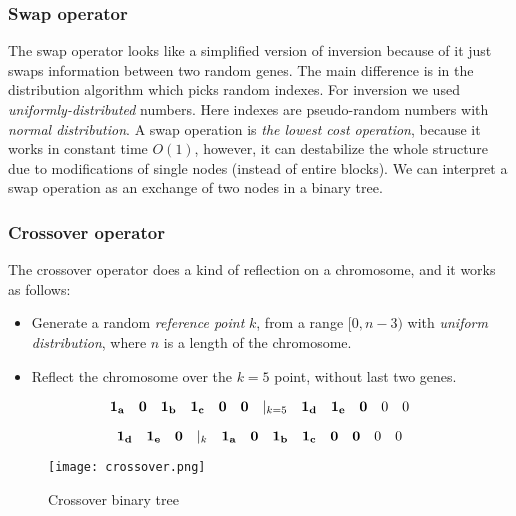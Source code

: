\documentclass[12pt]{article}
\begin{document}
\subsubsection{Swap operator}

The swap operator looks like a simplified version of inversion because of it just swaps information between two random genes. The main difference is in the distribution algorithm which picks random indexes. For inversion we used \textit{uniformly-distributed} numbers. Here indexes are pseudo-random numbers with \textit{normal distribution}.
A swap operation is \textit{the lowest cost operation}, because it works in constant time $O(1)$, however, it can destabilize the whole structure due to modifications of single nodes (instead of entire blocks). We can interpret a swap operation as an exchange of two nodes in a binary tree.



\subsubsection{Crossover operator}

The crossover operator does a kind of reflection on a chromosome, and it works as follows:
\begin{itemize}
\item Generate a random \textit{reference point} $k$, from a range $[0, n-3)$ with \textit{uniform distribution}, where $n$ is a length of the chromosome.
\item Reflect the chromosome over the $k=5$ point, without last two genes.
\end{itemize}

\[
    {\bf1_a\quad 0\quad 1_b\quad 1_c\quad 0\quad 0}\quad|_{k=5}\quad {\bf1_d\quad 1_e\quad 0}\quad 0\quad 0
\]

\[
    {\bf1_d\quad 1_e\quad 0} \quad |_k \quad {\bf 1_a\quad0\quad 1_b\quad 1_c\quad 0\quad 0}\quad 0\quad 0
\]

\begin{figure}[ht]
\centering
\texttt{[image: crossover.png]}
\caption{Crossover binary tree}
\label{fig:crossover}
\end{figure}


\end{document}
